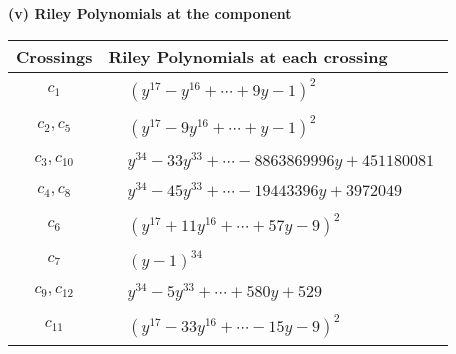 \documentclass[1p]{elsarticle_modified}
\theoremstyle{definition}
\begin{document}
\newpage\renewcommand{\arraystretch}{1}
\flushleft \textbf{(v) Riley Polynomials at the component}\newline \\
\begin{tabular}{m{50pt}|m{274pt}}
Crossings & \hspace{64pt}Riley Polynomials at each crossing \\
\hline $$\begin{aligned}c_{1}\end{aligned}$$&$\begin{aligned}
&(y^{17}- y^{16}+\cdots+9 y-1)^{2}
\end{aligned}$\\
\hline $$\begin{aligned}c_{2},c_{5}\end{aligned}$$&$\begin{aligned}
&(y^{17}-9 y^{16}+\cdots+y-1)^{2}
\end{aligned}$\\
\hline $$\begin{aligned}c_{3},c_{10}\end{aligned}$$&$\begin{aligned}
&y^{34}-33 y^{33}+\cdots-8863869996 y+451180081
\end{aligned}$\\
\hline $$\begin{aligned}c_{4},c_{8}\end{aligned}$$&$\begin{aligned}
&y^{34}-45 y^{33}+\cdots-19443396 y+3972049
\end{aligned}$\\
\hline $$\begin{aligned}c_{6}\end{aligned}$$&$\begin{aligned}
&(y^{17}+11 y^{16}+\cdots+57 y-9)^{2}
\end{aligned}$\\
\hline $$\begin{aligned}c_{7}\end{aligned}$$&$\begin{aligned}
&(y-1)^{34}
\end{aligned}$\\
\hline $$\begin{aligned}c_{9},c_{12}\end{aligned}$$&$\begin{aligned}
&y^{34}-5 y^{33}+\cdots+580 y+529
\end{aligned}$\\
\hline $$\begin{aligned}c_{11}\end{aligned}$$&$\begin{aligned}
&(y^{17}-33 y^{16}+\cdots-15 y-9)^{2}
\end{aligned}$\\
\hline
\end{tabular}\\~\\
\end{document}
